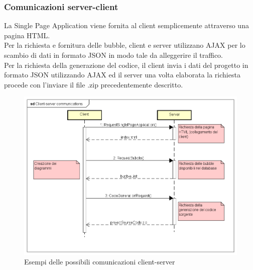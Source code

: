 \documentclass[../PianoDiQualifica.tex]{subfiles}
\begin{document}
			\subsubsection{Comunicazioni server-client}
				La Single Page Application viene fornita al client semplicemente attraverso una
				pagina HTML.\\
				Per la richiesta e fornitura delle bubble, client e server utilizzano AJAX per lo
				scambio di dati in formato JSON in modo tale da alleggerire il traffico.\\
				Per la richiesta della generazione del codice, il client invia i dati del progetto
				in formato JSON utilizzando AJAX ed il server una volta elaborata la richiesta procede
				con l'inviare il file .zip precedentemente descritto.
				\begin{figure}[H] \label{fig:ClientServerCommunications}
					\centering
					\includegraphics[scale=0.4]{Immagini/ClientServerCommunications.png}
					\caption{Esempi delle possibili comunicazioni client-server}
				\end{figure}
\end{document}
